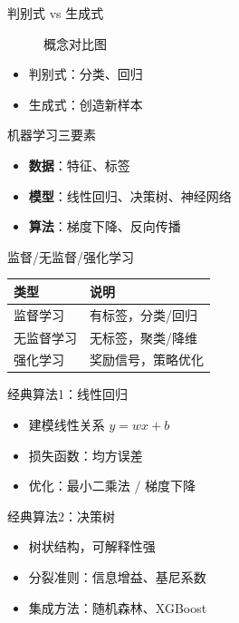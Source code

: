 \begin{frame}{判别式 vs 生成式}
\begin{figure}
\centering
{}
\caption{概念对比图}
\end{figure}
\begin{itemize}
    \item 判别式：分类、回归
    \item 生成式：创造新样本
\end{itemize}
\end{frame}

\begin{frame}{机器学习三要素}
\begin{itemize}
    \item \textbf{数据}：特征、标签
    \item \textbf{模型}：线性回归、决策树、神经网络
    \item \textbf{算法}：梯度下降、反向传播
\end{itemize}
\begin{center}
\end{center}
\end{frame}

\begin{frame}{监督/无监督/强化学习}
\begin{tabular}{p{}p{}}
\toprule
类型 & 说明 \\
\midrule
监督学习 & 有标签，分类/回归 \\
无监督学习 & 无标签，聚类/降维 \\
强化学习 & 奖励信号，策略优化 \\
\bottomrule
\end{tabular}
\end{frame}

\begin{frame}{经典算法1：线性回归}
\begin{itemize}
    \item 建模线性关系 \(y = wx + b\)
    \item 损失函数：均方误差
    \item 优化：最小二乘法 / 梯度下降
\end{itemize}
\end{frame}

\begin{frame}{经典算法2：决策树}
\begin{itemize}
    \item 树状结构，可解释性强
    \item 分裂准则：信息增益、基尼系数
    \item 集成方法：随机森林、XGBoost
\end{itemize}
\end{frame}

